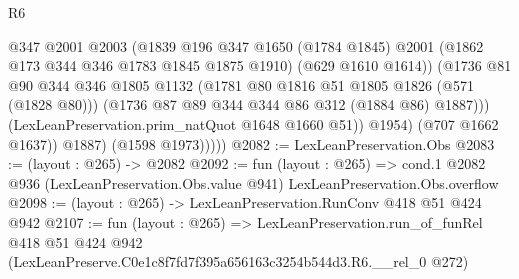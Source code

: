 \begin{lexlean}{R6}
\begin{coremodule}
                      @347
                      @2001
                      @2003
                      (@1839
                        @196
                        @347
                        @1650
                        (@1784 @1845)
                        @2001
                        (@1862 @173 @344 @346 @1783 @1845 @1875 @1910)
                        (@629 @1610 @1614))
                      (@1736
                        @81
                        @90
                        @344
                        @346
                        @1805
                        @1132
                        (@1781 @80 @1816 @51 @1805 @1826 (@571 (@1828 @80)))
                        (@1736 @87 @89 @344 @344 @86 @312 (@1884 @86) @1887)))
                    (LexLeanPreservation.prim_natQuot @1648 @1660 @51))
                  @1954)
                (@707 @1662 @1637))
              @1887)
            (@1598 @1973)))))
@2082 := LexLeanPreservation.Obs
@2083 := (layout : @265) -> @2082
@2092 := fun (layout : @265) =>
  cond.{1} @2082 @936 (LexLeanPreservation.Obs.value @941) LexLeanPreservation.Obs.overflow
@2098 := (layout : @265) -> LexLeanPreservation.RunConv @418 @51 @424 @942
@2107 := fun (layout : @265) =>
  LexLeanPreservation.run_of_funRel
    @418
    @51
    @424
    @942
    (LexLeanPreserve.C0e1c8f7fd7f395a656163c3254b544d3.R6.__rel_0 @272)
\end{coremodule}
\end{lexlean}
